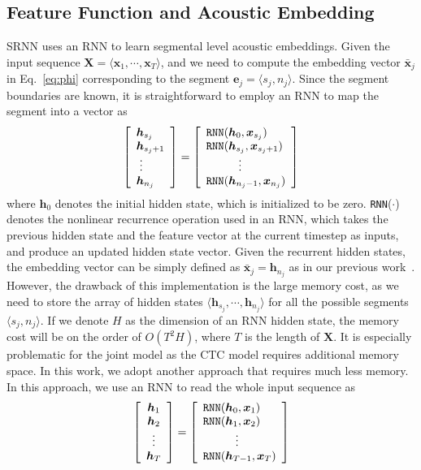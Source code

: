 \documentclass[a4paper]{article}
\begin{document}
\subsection{Feature Function and Acoustic Embedding}

SRNN uses an RNN to learn segmental level acoustic embeddings. Given the input sequence ${\bm X} = \langle {\bm x}_1, \cdots, {\bm x}_T\rangle$, and we need to compute the embedding vector $\bar{\bm x}_j$ in Eq.~\eqref{eq:phi} corresponding to the segment ${\bm e}_j = \langle s_j, n_j\rangle$. Since the segment boundaries are known, it is straightforward to employ an RNN to map the segment into a vector as 
\begin{align}
\left [ \begin{array}{l}
{\bm h}_{s_j}  \\
{\bm h}_{s_j+1}  \\
\hskip1mm \vdots \\
{\bm h}_{n_j}   
\end{array} \right] = 
\left [ \begin{array}{l}
  \text{\tt RNN}({\bm h}_0, {\bm x}_{s_j}) \\
  \text{\tt RNN}({\bm h}_{s_j}, {\bm x}_{s_j+1}) \\
  \hskip1cm \vdots \\
  \text{\tt RNN}({\bm h}_{n_j-1}, {\bm x}_{n_j}) 
\end{array} \right]
\end{align}
where ${\bm h}_0$ denotes the initial hidden state, which is initialized to be zero. {\tt RNN}($\cdot$) denotes the nonlinear recurrence operation used in an RNN, which takes the previous hidden state and the feature vector at the current timestep as inputs, and produce an updated hidden state vector. Given the recurrent hidden states, the embedding vector can be simply defined as $\bar{\bm x}_j= {\bm h}_{n_j}$ as in our previous work~\cite{lu2016segmental}. However, the drawback of this implementation is the large memory cost, as we need to store the array of hidden states $\langle {\bm h}_{s_j}, \cdots, {\bm h}_{n_j}\rangle$ for all the possible segments $\langle s_j, n_j\rangle$. If we denote $H$ as the dimension of an RNN hidden state, the memory cost will be on the order of $O(T^2H)$, where $T$ is the length of $\bm X$. It is especially problematic for the joint model as the CTC model requires additional memory space. In this work, we adopt another approach that requires much less memory. In this approach, we use an RNN to read the whole input sequence as 
\begin{align}
\left [ \begin{array}{c}
{\bm h}_{1}  \\
{\bm h}_{2}  \\
\vdots \\
{\bm h}_{T}   
\end{array} \right] = 
\left [ \begin{array}{l}
  \text{\tt RNN}({\bm h}_0, {\bm x}_{1}) \\
  \text{\tt RNN}({\bm h}_1, {\bm x}_{2}) \\
 \hskip1cm \vdots \\
  \text{\tt RNN}({\bm h}_{T-1}, {\bm x}_{T}) 
\end{array} \right]
\end{align}
\end{document}
